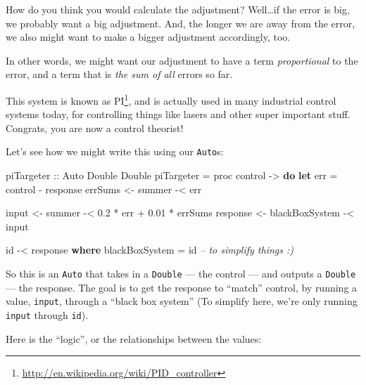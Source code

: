 \documentclass[]{article}
\newenvironment{Shaded}{}{}
\newcommand{\KeywordTok}[1]{\textcolor[rgb]{0.00,0.44,0.13}{\textbf{{#1}}}}
\newcommand{\DataTypeTok}[1]{\textcolor[rgb]{0.56,0.13,0.00}{{#1}}}
\newcommand{\FloatTok}[1]{\textcolor[rgb]{0.25,0.63,0.44}{{#1}}}
\newcommand{\CommentTok}[1]{\textcolor[rgb]{0.38,0.63,0.69}{\textit{{#1}}}}
\newcommand{\OtherTok}[1]{\textcolor[rgb]{0.00,0.44,0.13}{{#1}}}
\newcommand{\FunctionTok}[1]{\textcolor[rgb]{0.02,0.16,0.49}{{#1}}}
\newcommand{\NormalTok}[1]{{#1}}
\renewcommand{\href}[2]{#2\footnote{\url{#1}}}
\begin{document}
How do you think you would calculate the adjustment? Well\ldots{}if the
error is big, we probably want a big adjustment. And, the longer we are
away from the error, we also might want to make a bigger adjustment
accordingly, too.

In other words, we might want our adjustment to have a term
\emph{proportional} to the error, and a term that is \emph{the sum of
all} errors so far.

This system is known as
\href{http://en.wikipedia.org/wiki/PID_controller}{PI}, and is actually
used in many industrial control systems today, for controlling things
like lasers and other super important stuff. Congrats, you are now a
control theorist!

Let's see how we might write this using our \texttt{Auto}s:

\begin{Shaded}
\begin{Highlighting}[]
\OtherTok{piTargeter ::} \DataTypeTok{Auto} \DataTypeTok{Double} \DataTypeTok{Double}
\NormalTok{piTargeter }\FunctionTok{=} \NormalTok{proc control }\OtherTok{->} \KeywordTok{do}
    \KeywordTok{let} \NormalTok{err }\FunctionTok{=} \NormalTok{control }\FunctionTok{-} \NormalTok{response}
    \NormalTok{errSums  }\OtherTok{<-} \NormalTok{summer         }\FunctionTok{-<} \NormalTok{err}

    \NormalTok{input    }\OtherTok{<-} \NormalTok{summer         }\FunctionTok{-<} \FloatTok{0.2} \FunctionTok{*} \NormalTok{err }\FunctionTok{+} \FloatTok{0.01} \FunctionTok{*} \NormalTok{errSums}
    \NormalTok{response }\OtherTok{<-} \NormalTok{blackBoxSystem }\FunctionTok{-<} \NormalTok{input}

    \NormalTok{id }\FunctionTok{-<} \NormalTok{response}
  \KeywordTok{where}
    \NormalTok{blackBoxSystem }\FunctionTok{=} \NormalTok{id     }\CommentTok{-- to simplify things :)}
\end{Highlighting}
\end{Shaded}

So this is an \texttt{Auto} that takes in a \texttt{Double} --- the
control --- and outputs a \texttt{Double} --- the response. The goal is
to get the response to ``match'' control, by running a value,
\texttt{input}, through a ``black box system'' (To simplify here, we're
only running \texttt{input} through \texttt{id}).

Here is the ``logic'', or the relationships between the values:
\end{document}
